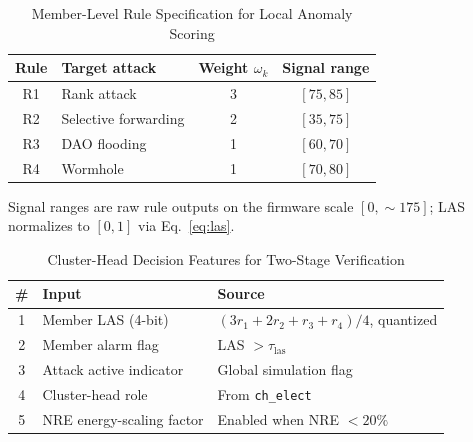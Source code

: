 \begin{table}[!t]
  \caption{Member-Level Rule Specification for Local Anomaly Scoring}
  \label{tab:rules}
  \centering
  \scriptsize
  \setlength{\tabcolsep}{3pt}
  \renewcommand{\arraystretch}{1.08}
  \begin{tabular}{@{}clcc@{}}
    \toprule
    \textbf{Rule} & \textbf{Target attack} & \textbf{Weight $\omega_k$} & \textbf{Signal range} \\
    \midrule
    R1 & Rank attack            & 3 & $[75,85]$ \\
    R2 & Selective forwarding    & 2 & $[35,75]$ \\
    R3 & DAO flooding            & 1 & $[60,70]$ \\
    R4 & Wormhole                & 1 & $[70,80]$ \\
    \bottomrule
  \end{tabular}
  \vspace{2pt}
  \raggedright\scriptsize
  Signal ranges are raw rule outputs on the firmware scale $[0,{\sim}175]$; LAS normalizes to $[0,1]$ via Eq.~\ref{eq:las}.
\end{table}

\begin{table}[!t]
  \caption{Cluster-Head Decision Features for Two-Stage Verification}
  \label{tab:ch-features}
  \centering
  \scriptsize
  \begin{tabular}{@{}cll@{}}
    \toprule
    \# & \textbf{Input} & \textbf{Source} \\
    \midrule
    1  & Member LAS (4-bit)         & $(3 r_1 + 2 r_2 + r_3 + r_4) / 4$, quantized \\
    2  & Member alarm flag          & LAS $> \tau_{\mathrm{las}}$ \\
    3  & Attack active indicator    & Global simulation flag \\
    4  & Cluster-head role          & From \texttt{ch\_elect} \\
    5  & NRE energy-scaling factor  & Enabled when NRE $< 20\%$ \\
    \bottomrule
  \end{tabular}
\end{table}
